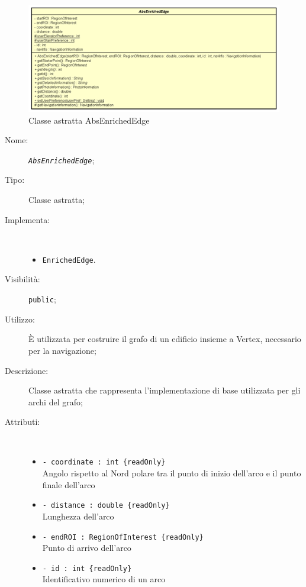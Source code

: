 \documentclass[../DefinizioneDiProdotto.tex]{subfiles}
\begin{document}
    \begin{figure}[H]
        \centering
        \includegraphics{img/AbsEnrichedEdge.png}
        \caption{Classe astratta AbsEnrichedEdge}\label{fig:model::navigator::graph::edge::AbsEnrichedEdge} 
    \end{figure}
    \begin{description}
\item[Nome:] \texttt{\textit{AbsEnrichedEdge}};
\item[Tipo:] Classe astratta;
\item[Implementa:] \
\begin{itemize}
\item \texttt{EnrichedEdge}.

\end{itemize}
\item[Visibilità:] \texttt{public};
\item[Utilizzo:] È utilizzata per costruire il grafo di un edificio insieme a Vertex, necessario per la navigazione;
\item[Descrizione:] Classe astratta che rappresenta l'implementazione di base utilizzata per gli archi del grafo;
\item[Attributi:] \
\begin{itemize}
\item \texttt{- coordinate : int \{readOnly\}}\\
Angolo rispetto al Nord polare tra il punto di inizio dell'arco e il punto finale dell'arco

\item \texttt{- distance : double \{readOnly\}}\\
Lunghezza dell'arco

\item \texttt{- endROI : RegionOfInterest \{readOnly\}}\\
Punto di arrivo dell'arco

\item \texttt{- id : int \{readOnly\}}\\
Identificativo numerico di un arco


\end{itemize}
\end{description}
\end{document}
